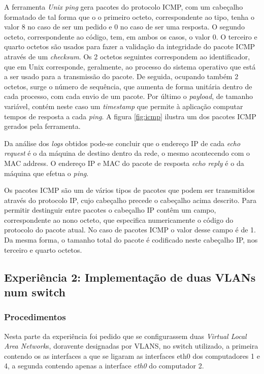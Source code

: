 \documentclass{article}
\begin{document}
A ferramenta \textit{Unix ping} gera pacotes do protocolo ICMP, com um cabeçalho formatado de tal forma que o o primeiro octeto, correspondente ao tipo, tenha o valor 8 no caso de ser um pedido e 0 no caso de ser uma resposta. O segundo octeto, correspondente ao código, tem, em ambos os casos, o valor 0. O terceiro e quarto octetos são usados para fazer a validação da integridade do pacote ICMP através de um \textit{checksum}. Os 2 octetos seguintes correspondem ao identificador, que em Unix corresponde, geralmente, ao processo do sistema operativo que está a ser usado para a transmissão do pacote. De seguida, ocupando também 2 octetos, surge o número de sequência, que aumenta de forma unitária dentro de cada processo, com cada envio de um pacote. Por último o \textit{payload}, de tamanho variável, contém neste caso um \textit{timestamp} que permite à aplicação computar tempos de resposta a cada \textit{ping}. A figura \ref{fig:icmp} ilustra um dos pacotes ICMP gerados pela ferramenta.

Da análise dos \textit{logs} obtidos pode-se concluir que o endereço IP de cada \textit{echo request} é o da máquina de destino dentro da rede, o mesmo acontecendo com o MAC address. O endereço IP e MAC do pacote de resposta \textit{echo reply} é o da máquina que efetua o \textit{ping}.

Os pacotes ICMP são um de vários tipos de pacotes que podem ser transmitidos através do protocolo IP, cujo cabeçalho precede o cabeçalho acima descrito. Para permitir destinguir entre pacotes o cabeçalho IP contêm um campo, correspondente ao nono octeto, que especifica numericamente o código do protocolo do pacote atual. No caso de pacotes ICMP o valor desse campo é de 1. Da mesma forma, o tamanho total do pacote é codificado neste cabeçalho IP, nos terceiro e quarto octetos.

\newpage
\subsection{Experiência 2: Implementação de duas VLANs num switch}
\subsubsection{Procedimentos}
Nesta parte da experiência foi pedido que se configurassem duas \textit{Virtual Local Area Network}s, doravente designadas por VLANS, no switch utilizado, a primeira contendo os as interfaces a que se ligaram as interfaces eth0 dos computadores 1 e 4, a segunda contendo apenas a interface \textit{eth0} do computador 2.
\end{document}

